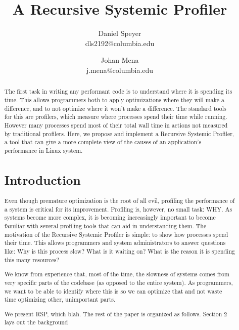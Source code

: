 \documentclass[10pt]{article}
\begin{document}
\author{Daniel Speyer\\dls2192@columbia.edu \and Johan Mena\\j.mena@columbia.edu}
\title{A Recursive Systemic Profiler}

\twocolumn[
\begin{@twocolumnfalse}
\maketitle

\end{@twocolumnfalse}
]

\begin{abstract}
The first task in writing any performant code is to understand where it is spending its time. This allows programmers both to apply optimizations where they will make a difference, and to not optimize where it won't make a difference. The standard tools for this are profilers, which measure where processes spend their time while running. However many processes spend most of their total wall time in actions not measured by traditional profilers. Here, we propose and implement a Recursive Systemic Profiler, a tool that can give a more complete view of the causes of an application’s performance in Linux system.

\section{Introduction}
Even though premature optimization is the root of all evil, profiling the performance of a system is critical for its improvement. Profiling is, however, no small task: WHY. As systems become more complex, it is becoming increasingly important to become familiar with several profiling tools that can aid in understanding them. The motivation of the Recursive Systemic Profiler is simple: to show how processes spend their time. This allows programmers and system administrators to answer questions like: Why is this process slow? What is it waiting on? What is the reason it is spending this many resources?

We know from experience that, most of the time, the slowness of systems comes from very specific parts of the codebase (as opposed to the entire system). As programmers, we want to be able to identify where this is so we can optimize that and not waste time optimizing other, unimportant parts.

We present RSP, which blah.
The rest of the paper is organized as follows. Section 2 lays out the background 


\end{abstract}
\end{document}
